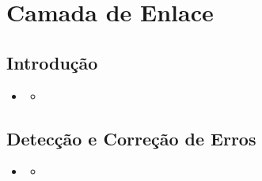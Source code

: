 \section{Camada de Enlace}

    \subsection{Introdução}
        
        \begin{itemize}[left=0.5cm, align=left, nosep]
            \item 
            \begin{itemize}[left=0.5cm, nosep, label=$\hookrightarrow$]
                \item 
            \end{itemize}
        \end{itemize}
    
        \subsubsection*{}


    \subsection{Detecção e Correção de Erros}
        
        \begin{itemize}[left=0.5cm, align=left, nosep]
            \item 
            \begin{itemize}[left=0.5cm, nosep, label=$\hookrightarrow$]
                \item 
            \end{itemize}
        \end{itemize}
    
        \subsubsection*{}


